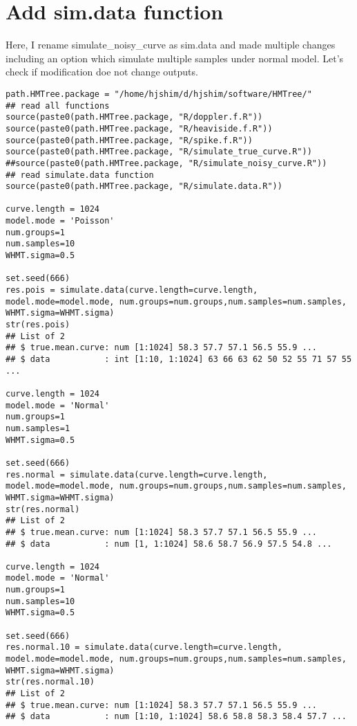 \documentclass[11pt]{article}
\begin{document}
\section{Add sim.data function}
\label{sec-2}
Here, I rename simulate\_noisy\_curve as sim.data and made multiple changes including an option which simulate multiple samples under normal model. Let's check if modification doe not change outputs. 
\begin{lstlisting}
path.HMTree.package = "/home/hjshim/d/hjshim/software/HMTree/"
## read all functions
source(paste0(path.HMTree.package, "R/doppler.f.R"))
source(paste0(path.HMTree.package, "R/heaviside.f.R"))
source(paste0(path.HMTree.package, "R/spike.f.R"))
source(paste0(path.HMTree.package, "R/simulate_true_curve.R"))
##source(paste0(path.HMTree.package, "R/simulate_noisy_curve.R"))
## read simulate.data function 
source(paste0(path.HMTree.package, "R/simulate.data.R"))

curve.length = 1024
model.mode = 'Poisson' 
num.groups=1
num.samples=10
WHMT.sigma=0.5

set.seed(666)
res.pois = simulate.data(curve.length=curve.length, model.mode=model.mode, num.groups=num.groups,num.samples=num.samples, WHMT.sigma=WHMT.sigma)
str(res.pois)
## List of 2
## $ true.mean.curve: num [1:1024] 58.3 57.7 57.1 56.5 55.9 ...
## $ data           : int [1:10, 1:1024] 63 66 63 62 50 52 55 71 57 55 ...

curve.length = 1024
model.mode = 'Normal' 
num.groups=1
num.samples=1
WHMT.sigma=0.5
 
set.seed(666) 
res.normal = simulate.data(curve.length=curve.length, model.mode=model.mode, num.groups=num.groups,num.samples=num.samples, WHMT.sigma=WHMT.sigma)
str(res.normal)
## List of 2
## $ true.mean.curve: num [1:1024] 58.3 57.7 57.1 56.5 55.9 ...
## $ data           : num [1, 1:1024] 58.6 58.7 56.9 57.5 54.8 ...

curve.length = 1024
model.mode = 'Normal' 
num.groups=1
num.samples=10
WHMT.sigma=0.5
 
set.seed(666) 
res.normal.10 = simulate.data(curve.length=curve.length, model.mode=model.mode, num.groups=num.groups,num.samples=num.samples, WHMT.sigma=WHMT.sigma)
str(res.normal.10)
## List of 2
## $ true.mean.curve: num [1:1024] 58.3 57.7 57.1 56.5 55.9 ...
## $ data           : num [1:10, 1:1024] 58.6 58.8 58.3 58.4 57.7 ...



\end{lstlisting}
\end{document}

